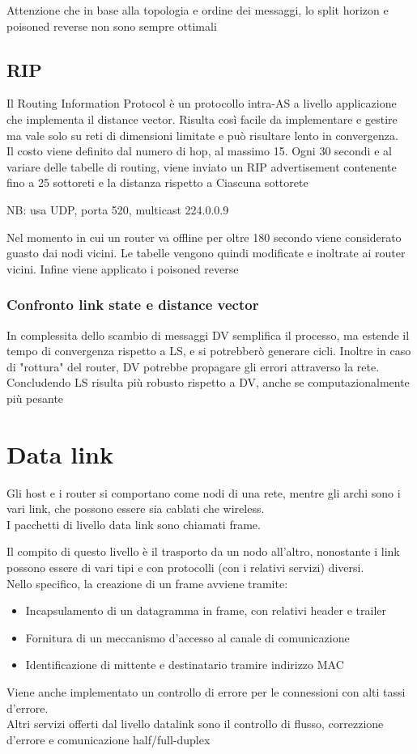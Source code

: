 \documentclass[12pt, a4paper]{article}
\begin{document}
Attenzione che in base alla topologia e ordine dei messaggi, lo split horizon e poisoned reverse non sono 
sempre ottimali

\subsection{RIP}
Il Routing Information Protocol è un protocollo intra-AS a livello applicazione che implementa il distance
vector. Risulta così facile da implementare e gestire ma vale solo su reti di dimensioni limitate e può
risultare lento in convergenza.\\Il costo viene definito dal numero di hop, al massimo 15. Ogni 30 secondi
e al variare delle tabelle di routing, viene inviato un RIP advertisement contenente fino a 25 sottoreti
e la distanza rispetto a Ciascuna sottorete

NB: usa UDP, porta 520, multicast 224.0.0.9

Nel momento in cui un router va offline per oltre 180 secondo viene considerato guasto dai nodi vicini.
Le tabelle vengono quindi modificate e inoltrate ai router vicini. Infine viene applicato i poisoned 
reverse

\subsubsection*{Confronto link state e distance vector}
In complessita dello scambio di messaggi DV semplifica il processo, ma estende il tempo di convergenza
rispetto a LS, e si potrebberò generare cicli. Inoltre in caso di "rottura" del router, DV potrebbe 
propagare gli errori attraverso la rete.\\Concludendo LS risulta più robusto rispetto a DV, anche se 
computazionalmente più pesante


\newpage
\section{Data link}
Gli host e i router si comportano come nodi di una rete, mentre gli archi sono i vari link, che possono 
essere sia cablati che wireless. \\I pacchetti di livello data link sono chiamati frame. 

Il compito di questo livello è il trasporto da un nodo all'altro, nonostante i link possono essere di 
vari tipi e con protocolli (con i relativi servizi) diversi. \\Nello specifico, la creazione di un 
frame avviene tramite:
\begin{itemize}
    \item Incapsulamento di un datagramma in frame, con relativi header e trailer
    \item Fornitura di un meccanismo d'accesso al canale di comunicazione
    \item Identificazione di mittente e destinatario tramire indirizzo MAC 
\end{itemize}
Viene anche implementato un controllo di errore per le connessioni con alti tassi d'errore.\\ Altri
servizi offerti dal livello datalink sono il controllo di flusso, correzzione d'errore e comunicazione
half/full-duplex
\end{document}

